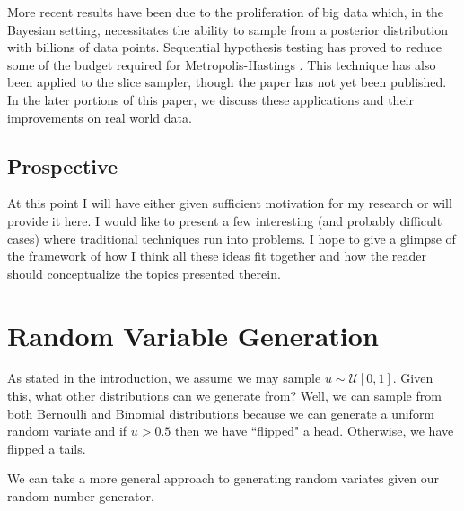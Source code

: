 \documentclass[11pt, a4paper]{article}
\theoremstyle{plain}
\theoremstyle{definition}
\begin{document}
More recent results have been due to the proliferation of big data which, in the Bayesian setting, necessitates the ability to sample from a posterior distribution with billions of data points. Sequential hypothesis testing
has proved to reduce some of the budget required for Metropolis-Hastings \cite{korattikara2013austerity}. This technique has also been applied to the slice sampler, though the paper has not yet been published. In the later portions of this paper, we discuss these applications and their improvements on real world data.
\subsection{Prospective}
At this point I will have either given sufficient motivation for my research or will provide it here. I would like to present a few interesting (and probably difficult cases) where traditional techniques run into problems. I hope
to give a glimpse of the framework of how I think all these ideas fit together and how the reader should
conceptualize the topics presented therein.
\section{Random Variable Generation}
As stated in the introduction, we assume
we may sample $u \sim \mathcal{U}[0, 1]$. Given this, what other distributions can
we generate from? Well, we can sample from both Bernoulli and Binomial
distributions because we can generate a uniform random
variate and if $u > 0.5$ then we have ``flipped" a head. Otherwise, we have
flipped a tails.

We can take a more general approach to generating random variates
given our random number generator.
\end{document}
